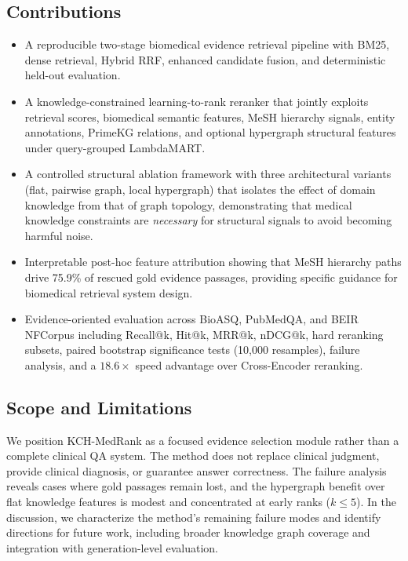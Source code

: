 \subsection*{Contributions}

\begin{itemize}
  \item A reproducible two-stage biomedical evidence retrieval pipeline with BM25, dense retrieval, Hybrid RRF, enhanced candidate fusion, and deterministic held-out evaluation.
  \item A knowledge-constrained learning-to-rank reranker that jointly exploits retrieval scores, biomedical semantic features, MeSH hierarchy signals, entity annotations, PrimeKG relations, and optional hypergraph structural features under query-grouped LambdaMART.
  \item A controlled structural ablation framework with three architectural variants (flat, pairwise graph, local hypergraph) that isolates the effect of domain knowledge from that of graph topology, demonstrating that medical knowledge constraints are \textit{necessary} for structural signals to avoid becoming harmful noise.
  \item Interpretable post-hoc feature attribution showing that MeSH hierarchy paths drive 75.9\% of rescued gold evidence passages, providing specific guidance for biomedical retrieval system design.
  \item Evidence-oriented evaluation across BioASQ, PubMedQA, and BEIR NFCorpus including Recall@k, Hit@k, MRR@k, nDCG@k, hard reranking subsets, paired bootstrap significance tests (10,000 resamples), failure analysis, and a $18.6\times$ speed advantage over Cross-Encoder reranking.
\end{itemize}

\subsection*{Scope and Limitations}

We position KCH-MedRank as a focused evidence selection module rather than a complete clinical QA system. The method does not replace clinical judgment, provide clinical diagnosis, or guarantee answer correctness. The failure analysis reveals cases where gold passages remain lost, and the hypergraph benefit over flat knowledge features is modest and concentrated at early ranks ($k \leq 5$). In the discussion, we characterize the method's remaining failure modes and identify directions for future work, including broader knowledge graph coverage and integration with generation-level evaluation.
